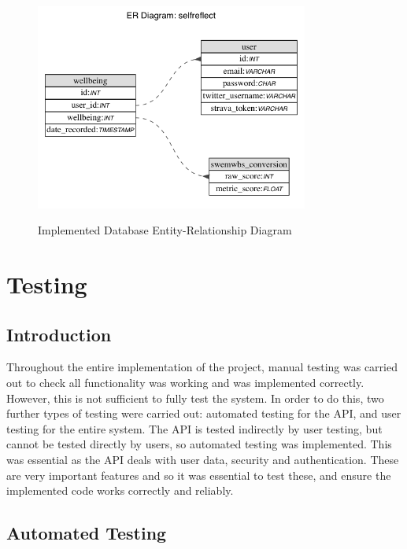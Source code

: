 \documentclass[11pt,openright,a4paper]{report}
\begin{document}
\begin{figure}[ht]
\centering
\caption{Implemented Database Entity-Relationship Diagram}
\includegraphics[width=0.8\textwidth]{i/dberdimpl.png}
\label{fig:dberdimpl}
\end{figure}

\chapter{Testing}
\section{Introduction}
Throughout the entire implementation of the project, manual testing was carried out to check all functionality was working and was implemented correctly. However, this is not sufficient to fully test the system. In order to do this, two further types of testing were carried out: automated testing for the API, and user testing for the entire system. The API is tested indirectly by user testing, but cannot be tested directly by users, so automated testing was implemented. This was essential as the API deals with user data, security and authentication. These are very important features and so it was essential to test these, and ensure the implemented code works correctly and reliably.

\section{Automated Testing}
\end{document}
